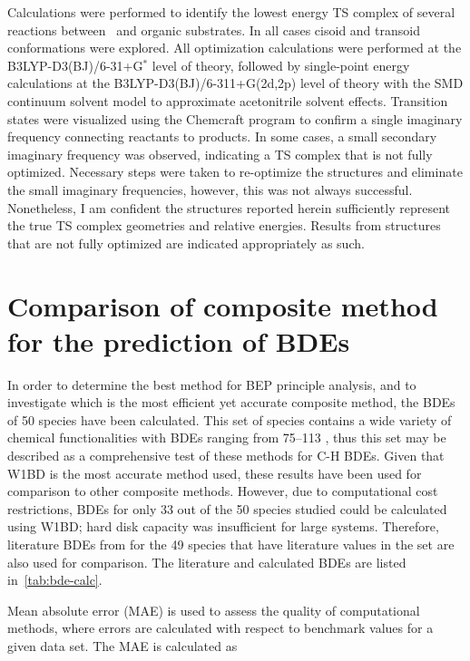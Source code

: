 Calculations were performed to identify the lowest energy TS complex of several
reactions between \cumo\ and organic substrates. In all cases cisoid and
transoid conformations were explored. All optimization calculations were
performed at the B3LYP-D3(BJ)/6-31+G$^*$ level of theory, followed by
single-point energy calculations at the B3LYP-D3(BJ)/6-311+G(2d,2p) level of
theory with the SMD continuum solvent model\cite{Marenich2009} to approximate
acetonitrile solvent effects. Transition states were visualized using the
Chemcraft program\cite{ccraft} to confirm a single imaginary frequency
connecting reactants to products. In some cases, a small secondary imaginary
frequency was observed, indicating a TS complex that is not fully optimized.
Necessary steps were taken to re-optimize the structures and eliminate the small
imaginary frequencies, however, this was not always successful. Nonetheless, I
am confident the structures reported herein sufficiently represent the true TS
complex geometries and relative energies. Results from structures that are not
fully optimized are indicated appropriately as such.

\section{Comparison of composite method for the prediction of BDEs}

In order to determine the best method for BEP principle analysis, and to
investigate which is the most efficient yet accurate composite method, the BDEs
of 50 species have been calculated. This set of species contains a wide variety
of chemical functionalities with BDEs ranging from 75--113 \kcalmol, thus this
set may be described as a comprehensive test of these methods for C-H BDEs.
Given that W1BD is the most accurate method used, these results have been used
for comparison to other composite methods. However, due to computational cost
restrictions, BDEs for only 33 out of the 50 species studied could be
calculated using W1BD; hard disk capacity was insufficient for large systems.
Therefore, literature BDEs from \citet{Luo2002} for the 49 species that have
literature values in the set are also used for comparison. The literature and
calculated BDEs are listed in~\ref{tab:bde-calc}.



Mean absolute error (MAE) is used to assess the quality of computational
methods, where errors are calculated with respect to benchmark values for a
given data set.\cite{Savin2014} The MAE is calculated as

